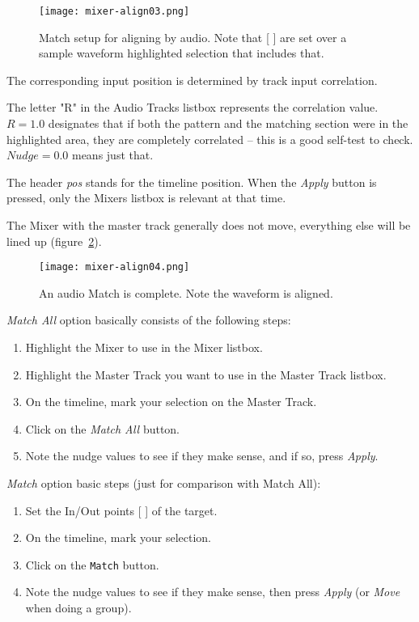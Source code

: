 \begin{figure}[htpb]
    \centering
    \texttt{[image: mixer-align03.png]}
    \caption{Match setup for aligning by audio.  Note that [ ] are set over a sample waveform highlighted selection that includes that.}
    \label{fig:mixer-align03}
\end{figure}

The corresponding input position is determined by track input correlation.

The letter "R" in the Audio Tracks listbox represents the correlation value.  $R=1.0$ designates that if both the pattern and the matching section were in the highlighted area, they are completely correlated -- this is a good self-test to check.
$Nudge=0.0$ means just that.

The header \textit{pos} stands for the timeline position. When the \textit{Apply} button is pressed, only the Mixers listbox is relevant at that time.

The Mixer with the master track generally does not move, everything else will be lined up (figure~\ref{fig:mixer-align04}).

\begin{figure}[htpb]
    \centering
    \texttt{[image: mixer-align04.png]}
    \caption{An audio Match is complete. Note the waveform is aligned.}
    \label{fig:mixer-align04}
\end{figure}

\textit{Match All} option basically consists of the following steps:

\begin{enumerate}
    \item Highlight the Mixer to use in the Mixer listbox.
    \item Highlight the Master Track you want to use in the Master Track listbox.
    \item On the timeline, mark your selection on the Master Track.
    \item Click on the \textit{Match All} button.
    \item Note the nudge values to see if they make sense, and if so, press \textit{Apply}.
\end{enumerate}

\textit{Match} option basic steps (just for comparison with Match All):

\begin{enumerate}
    \item Set the In/Out points [ ] of the target.
    \item On the timeline, mark your selection.
    \item Click on the \texttt{Match} button.
    \item Note the nudge values to see if they make sense, then press \textit{Apply} (or \textit{Move} when doing a group).
\end{enumerate}

